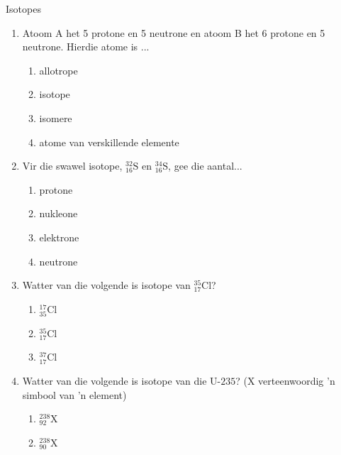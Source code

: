   \begin{exercises}  {Isotopes }
            \nopagebreak
        \label{m38753*id258162}\begin{enumerate}[noitemsep, label=\textbf{\arabic*}. ] 
            \label{m38753*uid50}\item Atoom A het 5 protone en 5 neutrone en atoom B het 6 protone en 5 neutrone. Hierdie atome is ...
\label{m38753*id258178}\begin{enumerate}[noitemsep, label=\textbf{\alph*}. ] 
            \label{m38753*uid51}\item allotrope
\label{m38753*uid52}\item isotope
\label{m38753*uid53}\item isomere
\label{m38753*uid54}\item atome van verskillende elemente
\end{enumerate}
                \label{m38753*uid55}\item Vir die swawel isotope, $_{16}^{32}\text{S}$ en $_{16}^{34}\text{S}$, gee die aantal...
\label{m38753*id258277}\begin{enumerate}[noitemsep, label=\textbf{\alph*}. ] 
            \label{m38753*uid56}\item protone
\label{m38753*uid57}\item nukleone
\label{m38753*uid58}\item elektrone
\label{m38753*uid59}\item neutrone
\end{enumerate}
                \label{m38753*uid60}\item Watter van die volgende is isotope van $_{17}^{35}\text{Cl}$?
\label{m38753*id258355}\begin{enumerate}[noitemsep, label=\textbf{\alph*}. ] 
            \label{m38753*uid61}\item $_{35}^{17}\text{Cl}$
\label{m38753*uid62}\item $_{17}^{35}\text{Cl}$
\label{m38753*uid63}\item $_{17}^{37}\text{Cl}$
\end{enumerate}
                \label{m38753*uid64}\item Watter van die volgende is isotope van die $\text{U-}235$? (X verteenwoordig 'n simbool van 'n element)
\label{m38753*id258452}\begin{enumerate}[noitemsep, label=\textbf{\alph*}. ] 
            \label{m38753*uid65}\item $_{92}^{238}\text{X}$
\label{m38753*uid66}\item $_{90}^{238}\text{X}$

\end{enumerate}
\end{enumerate}
\end{exercises}
